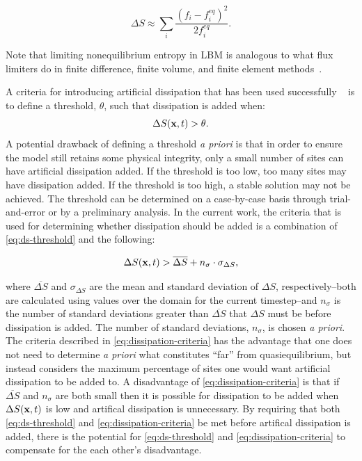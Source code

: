 \begin{equation} \label{eq:quadratic-entropy}
\Delta S \approx \sum_i \frac{(f_i - f^{eq}_i)^2}{2f^{eq}_i}.
\end{equation}

\noindent Note that limiting nonequilibrium entropy in LBM is analogous to what flux limiters do in finite difference, finite volume, and finite element methods~\cite{brownlee2008nonequilibrium}.

A criteria for introducing artificial dissipation that has been used successfully ~\cite{gorban2014enhancement,brownlee2006stabilization,brownlee2007stability,brownlee2008nonequilibrium} is to define a threshold, $\theta$, such that dissipation is added when:
\begin{equation} \label{eq:ds-threshold}
  \Delta S(\mathbf{x}, t) > \theta.
\end{equation}
A potential drawback of defining a threshold \textit{a priori} is that in order to ensure the model still retains some physical integrity, only a small number of sites can have artificial dissipation added.
If the threshold is too low, too many sites may have dissipation added.
If the threshold is too high, a stable solution may not be achieved.
The threshold can be determined on a case-by-case basis through trial-and-error or by a preliminary analysis.
In the current work, the criteria that is used for determining whether dissipation should be added is a combination of \eqref{eq:ds-threshold} and the following:

\begin{equation} \label{eq:dissipation-criteria}
  \Delta S(\mathbf{x}, t) > \overline{\Delta S} + n_\sigma \cdot \sigma_{\Delta S},
\end{equation}

\noindent where $\overline{\Delta S}$ and $\sigma_{\Delta S}$ are the mean and standard deviation of $\Delta S$, respectively--both are calculated using values over the domain for the current timestep--and $n_\sigma$ is the number of standard deviations greater than $\overline{\Delta S}$ that $\Delta S$ must be before dissipation is added.
The number of standard deviations, $n_\sigma$, is chosen \textit{a priori}.
The criteria described in \eqref{eq:dissipation-criteria} has the advantage that one does not need to determine \textit{a priori} what constitutes ``far'' from quasiequilibrium, but instead considers the maximum percentage of sites one would want artificial dissipation to be added to.
A disadvantage of \eqref{eq:dissipation-criteria} is that if $\overline{\Delta S}$ and $n_\sigma$ are both small then it is possible for dissipation to be added when $\Delta S(\mathbf{x}, t)$ is low and artifical dissipation is unnecessary.
By requiring that both \eqref{eq:ds-threshold} and \eqref{eq:dissipation-criteria} be met before artifical dissipation is added, there is the potential for \eqref{eq:ds-threshold} and \eqref{eq:dissipation-criteria} to compensate for the each other's disadvantage.


